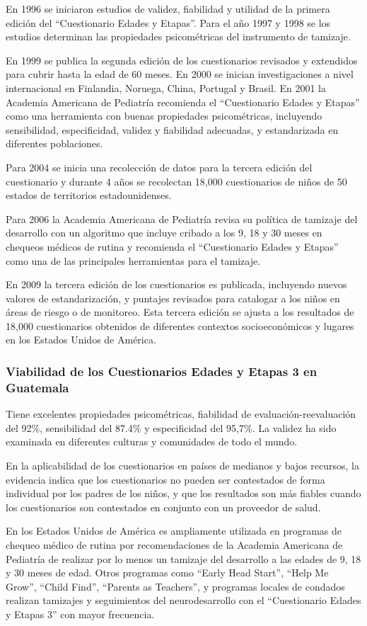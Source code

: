 En 1996 se iniciaron estudios de validez, fiabilidad y utilidad de la primera
edición del ``Cuestionario Edades y Etapas''. Para el año 1997 y 1998 se los
estudios determinan las propiedades psicométricas del instrumento de tamizaje.
\cite{ASQ4decades}

En 1999 se publica la segunda edición de los cuestionarios revisados y
extendidos para cubrir hasta la edad de 60 meses. En 2000 se inician
investigaciones a nivel internacional en Finlandia, Noruega, China, Portugal y
Brasil. En 2001 la Academia Americana de Pediatría recomienda el ``Cuestionario
Edades y Etapas'' como una herramienta con buenas propiedades psicométricas,
incluyendo sensibilidad, especificidad, validez y fiabilidad adecuadas, y
estandarizada en diferentes poblaciones. \cite{Pediatrics2001}

Para 2004 se inicia una recolección de datos para la tercera edición del
cuestionario y durante 4 años se recolectan 18,000 cuestionarios de niños de 50
estados de territorios estadounidenses. \cite{ASQ4decades}

Para 2006 la Academia Americana de Pediatría revisa su política de tamizaje del
desarrollo con un algoritmo que incluye cribado a los 9, 18 y 30 meses en
chequeos médicos de rutina y recomienda el ``Cuestionario Edades y Etapas''
como una de las principales herramientas para el tamizaje.
\cite{Pediatrics2006}
 
En 2009 la tercera edición de los cuestionarios es publicada, incluyendo nuevos
valores de estandarización, y puntajes revisados para catalogar a los niños en
áreas de riesgo o de monitoreo. Esta tercera edición se ajusta a los resultados
de 18,000 cuestionarios obtenidos de diferentes contextos socioeconómicos y
lugares en los Estados Unidos de América. \cite{ASQ4decades}

\subsubsection{Viabilidad de los Cuestionarios Edades y Etapas 3 en Guatemala}
Tiene excelentes propiedades psicométricas, fiabilidad de
evaluación-reevaluación del 92\%, sensibilidad del 87.4\% y especificidad del
95,7\%. La validez ha sido examinada en diferentes culturas y comunidades de
todo el mundo.
\cite{Vameghi2013-uo, SarmientoCampos2010, Heo2007, Saihong2010, CMehner2019}

En la aplicabilidad de los cuestionarios en países de medianos y bajos
recursos, la evidencia indica que los cuestionarios no pueden ser contestados
de forma individual por los padres de los niños, y que los resultados son más
fiables cuando los cuestionarios son contestados en conjunto con un proveedor
de salud. \cite{Manasyan2023, Colbert2021}

En los Estados Unidos de América es ampliamente utilizada en programas de
chequeo médico de rutina por recomendaciones de la Academia Americana de
Pediatría de realizar por lo menos un tamizaje del desarrollo a las edades de
9, 18 y 30 meses de edad. Otros programas como ``Early Head Start'', ``Help Me
Grow'', ``Child Find'', ``Parents as Teachers'', y programas locales de
condados realizan tamizajes y seguimientos del neurodesarrollo con el
``Cuestionario Edades y Etapas 3'' con mayor frecuencia. \cite{ASQWorld}
